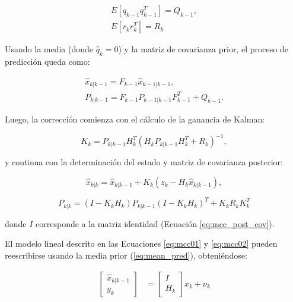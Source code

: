 \begin{equation}
\begin{gathered}
E[q_{k-1}q_{k-1}^T] = Q_{k-1}, \\
E[r_{k}r_{k}^T] = R_{k}
\end{gathered}
\end{equation}

Usando la media (donde $\hat{q}_k=0$) y la matriz de covarianza prior, el proceso de predicci\'on queda como: 

\begin{equation}
\begin{gathered}
\hat{x}_{k|k-1} = F_{k-1}\hat{x}_{k-1|k-1},\\
P_{k|k-1} = F_{k-1}P_{k-1|k-1}F_{k-1}^T + Q_{k-1}.
\end{gathered}
\label{eq:mean_pred}
\end{equation}


Luego, la correcci\'on comienza con el c\'alculo de la ganancia de Kalman:

\begin{equation}
K_k = P_{k|k-1} H_k^T (H_kP_{k|k-1}H_k^T + R_k)^{-1},
\label{eq:mcc_kalman_gain}
\end{equation}

y continua con la determinaci\'on del estado y matriz de covarianza posterior:

\begin{equation}
\hat{x}_{k|k} = \hat{x}_{k|k-1} + K_k(z_k - H_k \hat{x}_{k|k-1}),
\label{eq:mcc_post_state}
\end{equation}

\begin{equation}
P_{k|k} = (I - K_kH_k)P_{k|k-1} (I - K_kH_k)^T + K_kR_kK_k^T
\label{eq:mcc_post_cov}
\end{equation}

donde $I$ corresponde a la matriz identidad (Ecuaci\'on \ref{eq:mcc_post_cov}).
\bigskip

El modelo lineal descrito en las Ecuaciones \ref{eq:mcc01} y \ref{eq:mcc02} pueden reescribirse usando la media prior (\ref{eq:mean_pred}), obteni\'endose:


  \begin{align}
    \begin{bmatrix}
    \hat{x}_{k|k-1}\\
    y_k
	\end{bmatrix}     &= \begin{bmatrix}
          I \\
           H_{k}
         \end{bmatrix} x_k + \nu_k
         \label{eq:nu_det01}
  \end{align} 

